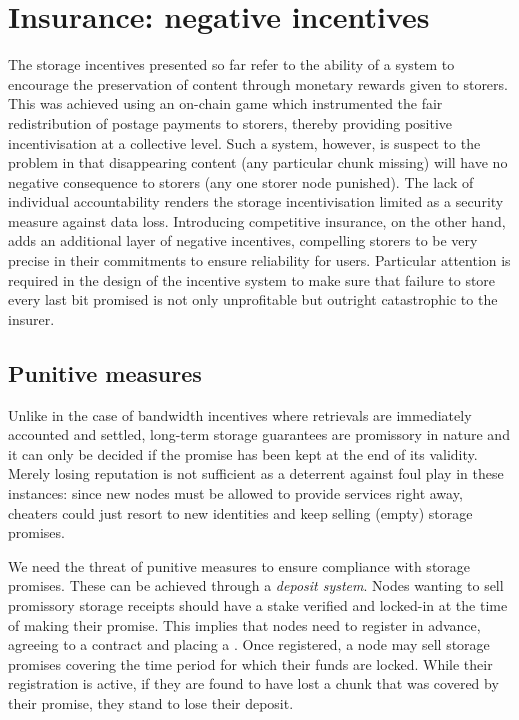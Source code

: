 
\section{Insurance: negative incentives \statusorange}\label{sec:chunk-insurance}


The storage incentives presented so far refer to the ability of a system to encourage the preservation of content through monetary rewards given to storers. This was achieved using an on-chain game which instrumented the fair redistribution of postage payments to storers, thereby providing positive incentivisation at a collective level. Such a system,  however, is suspect to the  problem in that disappearing content (any particular chunk missing) will have no negative consequence to storers (any one storer node punished). The lack of individual accountability renders the storage incentivisation limited as a security measure against data loss. Introducing competitive insurance, on the other hand, adds an additional layer of negative incentives, compelling storers to be very precise in their commitments to ensure reliability for users. Particular attention is required in the design of the incentive system to make sure that failure to store every last bit promised is not only unprofitable but outright catastrophic to the insurer. 

\subsection{Punitive measures}

Unlike in the case of bandwidth incentives where retrievals are immediately accounted and settled, long-term storage guarantees are promissory in nature and it can only be decided if the promise has been kept at the end of its validity. Merely losing reputation is not sufficient as a deterrent against foul play in these instances: since new nodes must be allowed to provide services right away, cheaters could just resort to new identities and keep selling (empty) storage promises.

We need the threat of punitive measures to ensure compliance with storage promises. These can be achieved through a \emph{deposit system}. Nodes wanting to sell promissory storage receipts should have a stake verified and locked-in at the time of making their promise. This implies that nodes need to register in advance, agreeing to a contract and placing a . Once registered, a node may sell storage promises covering the time period for which their funds are locked. While their registration is active, if they are found to have lost a chunk that was covered by their promise, they stand to lose their deposit.

